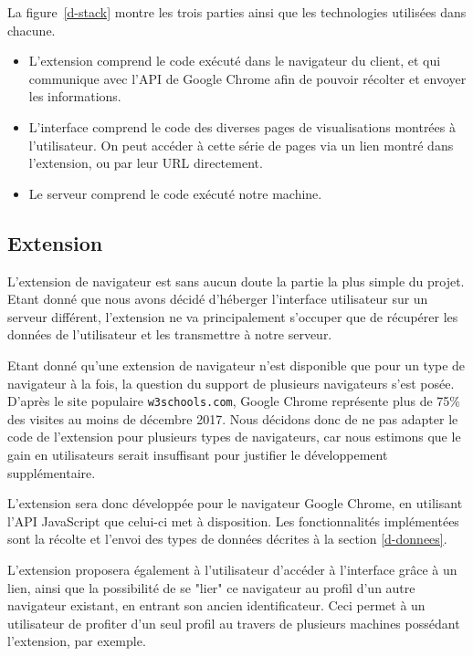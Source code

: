 		La figure~\ref{d-stack} montre les trois parties ainsi que les technologies utilisées dans chacune.

		\begin{itemize}
			\item L'extension comprend le code exécuté dans le navigateur du client, et qui communique avec l'API de Google Chrome afin de pouvoir récolter et envoyer les informations.
			\item L'interface comprend le code des diverses pages de visualisations montrées à l'utilisateur. On peut accéder à cette série de pages via un lien montré dans l'extension, ou par leur URL directement.
			\item Le serveur comprend le code exécuté notre machine.
		\end{itemize}

	\subsection{Extension}

		L'extension de navigateur est sans aucun doute la partie la plus simple du projet. Etant donné que nous avons décidé d'héberger l'interface utilisateur sur un serveur différent, l'extension ne va principalement s'occuper que de récupérer les données de l'utilisateur et les transmettre à notre serveur.

		Etant donné qu'une extension de navigateur n'est disponible que pour un type de navigateur à la fois, la question du support de plusieurs navigateurs s'est posée. D'après le site populaire \texttt{w3schools.com}\cite{browser-stats}, Google Chrome représente plus de 75\% des visites au moins de décembre 2017. Nous décidons donc de ne pas adapter le code de l'extension pour plusieurs types de navigateurs, car nous estimons que le gain en utilisateurs serait insuffisant pour justifier le développement supplémentaire.

		L'extension sera donc développée pour le navigateur Google Chrome, en utilisant l'API JavaScript que celui-ci met à disposition. Les fonctionnalités implémentées sont la récolte et l'envoi des types de données décrites à la section \ref{d-donnees}.

		L'extension proposera également à l'utilisateur d'accéder à l'interface grâce à un lien, ainsi que la possibilité de se "lier" ce navigateur au profil d'un autre navigateur existant, en entrant son ancien identificateur. Ceci permet à un utilisateur de profiter d'un seul profil au travers de plusieurs machines possédant l'extension, par exemple. 

